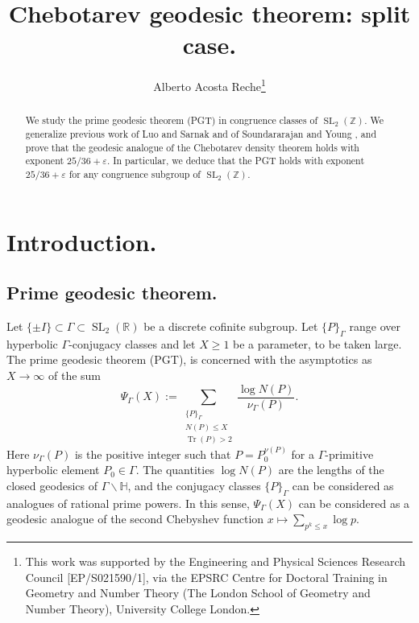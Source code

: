 \documentclass{article}
\theoremstyle{named}
\newcommand{\Z}{\mathbb{Z}}
\newcommand{\Hyp}{\mathbb{H}}
\newcommand{\R}{\mathbb{R}}
\newcommand{\N}{\mathcal{N}}
\DeclareMathOperator{\SL}{SL}
\DeclareMathOperator{\Tr}{Tr}
\begin{document}
\title{Chebotarev geodesic theorem: split case.}
\author{Alberto Acosta Reche\thanks{This work was supported by the Engineering and Physical Sciences Research Council [EP/S021590/1], via the
EPSRC Centre for Doctoral Training in Geometry and Number Theory (The London School of Geometry and Number
Theory), University College London.}}
\date{}



\maketitle


\begin{abstract}
We study the prime geodesic theorem (PGT) in congruence classes of $\SL_2(\Z)$. We generalize previous work of Luo and Sarnak \cite{luosarnak} and of Soundararajan and Young \cite{Soundararajan_2013}, and prove that the geodesic analogue of the Chebotarev density theorem holds with exponent $25/36 + \varepsilon$. In particular, we deduce that the PGT holds with exponent $25/36 + \varepsilon$ for any congruence subgroup of $\SL_2(\Z)$. 
\end{abstract}




\section{Introduction.}\label{sec:introduction}
\subsection{Prime geodesic theorem.}
Let $\{\pm I\} \subset \Gamma \subset \SL_2(\R)$ be a discrete cofinite subgroup. Let $\{P\}_{\Gamma}$ range over hyperbolic $\Gamma$-conjugacy classes and let $X \geq 1$ be a parameter, to be taken large. The prime geodesic theorem (PGT), is concerned with the asymptotics as $X \to \infty$ of the sum 
\begin{equation}\label{eq:defiofprimegeodesicsum}
    \Psi_{\Gamma}(X) := \sum_{\substack{\{P\}_{\Gamma}\\N(P)\leq X\\
    \Tr(P) > 2}}\frac{\log N(P)}{\nu_\Gamma(P)}.
\end{equation}
Here $\nu_\Gamma(P)$ is the positive integer such that $P = P_0^{\nu(P)}$ for a $\Gamma$-primitive hyperbolic element $P_0 \in \Gamma$. The quantities $\log N(P)$ are the lengths of the closed geodesics of $\Gamma\backslash \Hyp$, and the conjugacy classes $\{P\}_\Gamma$ can be considered as analogues of rational prime powers. In this sense, $\Psi_{\Gamma}(X)$ can be considered as a geodesic analogue of the second Chebyshev function $x \mapsto \sum_{p^k \leq x} \log p$. 
\end{document}
